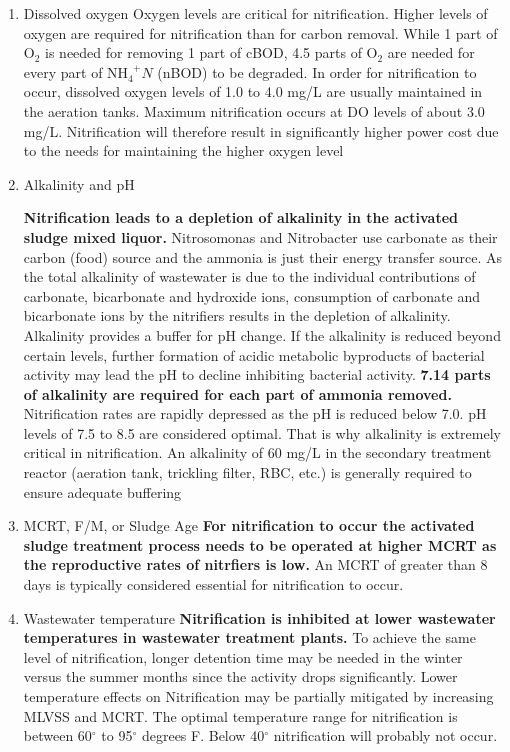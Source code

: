 			\begin{enumerate}
				\item Dissolved oxygen
				\noindent Oxygen levels are critical for nitrification. Higher levels of oxygen are required for nitrification than for carbon removal.  While 1 part of O$_2$ is needed for removing 1 part of cBOD, 4.5 parts of O$_2$ are needed for every part of NH$_4^{\enspace +}N$ (nBOD) to be degraded. In order for nitrification to occur, dissolved oxygen levels of 1.0 to 4.0 mg/L are usually maintained in the aeration tanks.  Maximum nitrification occurs at DO levels of about 3.0 mg/L.  Nitrification will therefore result in significantly higher power cost due to the needs for maintaining the higher oxygen level
				\item Alkalinity and pH

				\noindent \textbf{Nitrification leads to a depletion of alkalinity in the activated sludge mixed liquor.}  Nitrosomonas and Nitrobacter use carbonate as their carbon (food) source and the ammonia is just their energy transfer source.  As the total alkalinity of wastewater is due to the individual contributions of carbonate, bicarbonate and hydroxide ions, consumption of carbonate and bicarbonate ions by the nitrifiers results in the depletion of alkalinity.  Alkalinity provides a buffer for pH change.  If the alkalinity is reduced beyond certain levels, further formation of acidic metabolic byproducts of bacterial activity may lead the pH to decline inhibiting bacterial activity. \textbf{7.14 parts of alkalinity are required for each part of ammonia removed.}    Nitrification rates are rapidly depressed as the pH is reduced below 7.0. pH levels of 7.5 to 8.5 are considered optimal.  That is why alkalinity is extremely critical in nitrification.  An alkalinity of 60 mg/L in the secondary treatment reactor (aeration tank, trickling filter, RBC, etc.) is generally required to ensure adequate buffering
	 			\item MCRT, F/M, or Sludge Age
				\noindent \textbf{For nitrification to occur the activated sludge treatment process needs to be operated at higher MCRT as the reproductive rates of nitrfiers is low.}  An MCRT of greater than 8 days is typically considered essential for nitrification to occur.
				\item Wastewater temperature
				\noindent \textbf{Nitrification is inhibited at lower wastewater temperatures in wastewater treatment plants.} To achieve the same level of nitrification, longer detention time may be needed in the winter versus the summer months since the activity drops significantly.  Lower temperature effects on Nitrification may be partially mitigated by increasing MLVSS and MCRT.  The optimal temperature range for nitrification is between 60$^{\circ}$  to 95$^{\circ}$  degrees F. Below 40$^{\circ}$  nitrification will probably not occur.
	

\end{enumerate}
